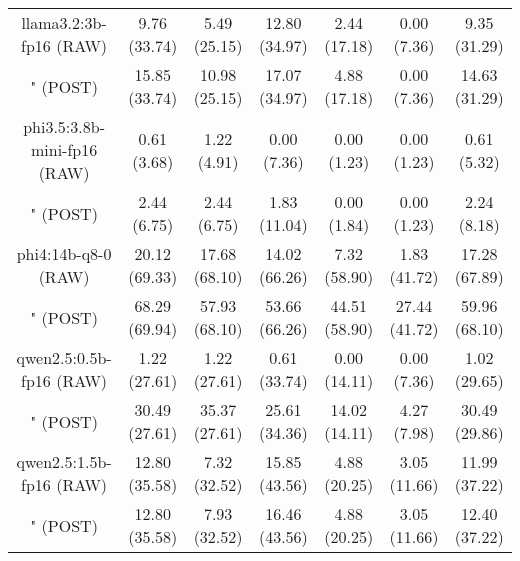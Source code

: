 \begin{table}[]
{\begin{tabular}{ccccccc}
      \multicolumn{1}{c|}{llama3.2:3b-fp16 (RAW)} & 9.76 (33.74) & 5.49 (25.15) & \multicolumn{1}{c|}{12.80 (34.97)} & 2.44 (17.18) & \multicolumn{1}{c|}{0.00 (7.36)} & 9.35 (31.29) \\

      \multicolumn{1}{c|}{" (POST)} & 15.85 (33.74) & 10.98 (25.15) & \multicolumn{1}{c|}{17.07 (34.97)} & 4.88 (17.18) & \multicolumn{1}{c|}{0.00 (7.36)} & 14.63 (31.29) \\
      \cline{1-7}

      \multicolumn{1}{c|}{phi3.5:3.8b-mini-fp16 (RAW)} & 0.61 (3.68) & 1.22 (4.91) & \multicolumn{1}{c|}{0.00 (7.36)} & 0.00 (1.23) & \multicolumn{1}{c|}{0.00 (1.23)} & 0.61 (5.32) \\

      \multicolumn{1}{c|}{" (POST)} & 2.44 (6.75) & 2.44 (6.75) & \multicolumn{1}{c|}{1.83 (11.04)} & 0.00 (1.84) & \multicolumn{1}{c|}{0.00 (1.23)} & 2.24 (8.18) \\
      \cline{1-7}

      \multicolumn{1}{c|}{phi4:14b-q8-0 (RAW)} & 20.12 (69.33) & 17.68 (68.10) & \multicolumn{1}{c|}{14.02 (66.26)} & 7.32 (58.90) & \multicolumn{1}{c|}{1.83 (41.72)} & 17.28 (67.89) \\

      \multicolumn{1}{c|}{" (POST)} & 68.29 (69.94) & 57.93 (68.10) & \multicolumn{1}{c|}{53.66 (66.26)} & 44.51 (58.90) & \multicolumn{1}{c|}{27.44 (41.72)} & 59.96 (68.10) \\
      \cline{1-7}

      \multicolumn{1}{c|}{qwen2.5:0.5b-fp16 (RAW)} & 1.22 (27.61) & 1.22 (27.61) & \multicolumn{1}{c|}{0.61 (33.74)} & 0.00 (14.11) & \multicolumn{1}{c|}{0.00 (7.36)} & 1.02 (29.65) \\

      \multicolumn{1}{c|}{" (POST)} & 30.49 (27.61) & 35.37 (27.61) & \multicolumn{1}{c|}{25.61 (34.36)} & 14.02 (14.11) & \multicolumn{1}{c|}{4.27 (7.98)} & 30.49 (29.86) \\
      \cline{1-7}

      \multicolumn{1}{c|}{qwen2.5:1.5b-fp16 (RAW)} & 12.80 (35.58) & 7.32 (32.52) & \multicolumn{1}{c|}{15.85 (43.56)} & 4.88 (20.25) & \multicolumn{1}{c|}{3.05 (11.66)} & 11.99 (37.22) \\

      \multicolumn{1}{c|}{" (POST)} & 12.80 (35.58) & 7.93 (32.52) & \multicolumn{1}{c|}{16.46 (43.56)} & 4.88 (20.25) & \multicolumn{1}{c|}{3.05 (11.66)} & 12.40 (37.22) \\
      \cline{1-7}


\end{tabular}}
\end{table}
